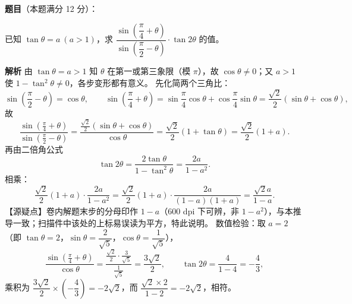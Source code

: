 \begin{answer}

\textbf{题目}（本题满分 12 分）：

已知 $\tan\theta=a\ (a>1)$，求 $\dfrac{\sin\left(\dfrac\pi4+\theta\right)}{\sin\left(\dfrac\pi2-\theta\right)}\cdot\tan2\theta$ 的值。

\textbf{解析}
由 $\tan\theta=a>1$ 知 $\theta$ 在第一或第三象限（模 $\pi$），故 $\cos\theta\neq0$；又 $a>1$ 使 $1-\tan^2\theta\neq0$，各步变形都有意义。
先化简两个三角比：
\nopagebreak[4]
\[\sin\left(\frac\pi2-\theta\right)=\cos\theta,\qquad
\sin\left(\frac\pi4+\theta\right)=\sin\frac\pi4\cos\theta+\cos\frac\pi4\sin\theta=\frac{\sqrt2}{2}\left(\sin\theta+\cos\theta\right),\]
故
\nopagebreak[4]
\[\frac{\sin\left(\frac\pi4+\theta\right)}{\sin\left(\frac\pi2-\theta\right)}
=\frac{\frac{\sqrt2}{2}\left(\sin\theta+\cos\theta\right)}{\cos\theta}
=\frac{\sqrt2}{2}\left(1+\tan\theta\right)=\frac{\sqrt2}{2}\left(1+a\right).\]
再由二倍角公式
\nopagebreak[4]
\[\tan2\theta=\frac{2\tan\theta}{1-\tan^2\theta}=\frac{2a}{1-a^2}.\]
相乘：
\nopagebreak[4]
\[\frac{\sqrt2}{2}\left(1+a\right)\cdot\frac{2a}{1-a^2}
=\frac{\sqrt2}{2}\left(1+a\right)\cdot\frac{2a}{\left(1-a\right)\left(1+a\right)}
=\frac{\sqrt2a}{1-a}.\]
【源疑点】卷内解题末步的分母印作 $1-a$（$600$ dpi 下可辨，非 $1-a^2$），与本推导一致；扫描件中该处的上标易误读为平方，特此说明。
数值检验：取 $a=2$（即 $\tan\theta=2$，$\sin\theta=\dfrac{2}{\sqrt5}$，$\cos\theta=\dfrac1{\sqrt5}$），
\nopagebreak[4]
\[\frac{\sin\left(\frac\pi4+\theta\right)}{\cos\theta}=\frac{\frac{\sqrt2}{2}\cdot\frac{3}{\sqrt5}}{\frac1{\sqrt5}}=\frac{3\sqrt2}{2},\qquad \tan2\theta=\frac{4}{1-4}=-\frac43,\]
乘积为 $\dfrac{3\sqrt2}{2}\times\left(-\dfrac43\right)=-2\sqrt2$，而 $\dfrac{\sqrt2\times2}{1-2}=-2\sqrt2$，相符。


\end{answer}
